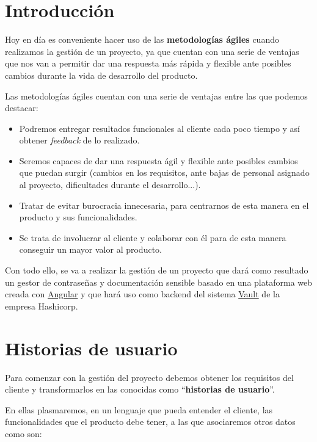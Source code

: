 \documentclass{\ClassPath/viu-tfm-template}
\begin{document}
    \graphicspath{{../VIU_TFM_LaTeX_template/}}

    \coverpage

    \tableofcontents

\chapter{Introducción}

Hoy en día es conveniente hacer uso de las \textbf{metodologías ágiles} cuando realizamos la gestión de un proyecto, ya que cuentan con una serie de ventajas que nos van a permitir dar una respuesta más rápida y flexible ante posibles cambios durante la vida de desarrollo del producto.

Las metodologías ágiles cuentan con una serie de ventajas entre las que podemos destacar:

\begin{itemize}
    \item Podremos entregar resultados funcionales al cliente cada poco tiempo y así obtener \textit{feedback} de lo realizado.
    \item Seremos capaces de dar una respuesta ágil y flexible ante posibles cambios que puedan surgir (cambios en los requisitos, ante bajas de personal asignado al proyecto, dificultades durante el desarrollo...).
    \item Tratar de evitar burocracia innecesaria, para centrarnos de esta manera en el producto y sus funcionalidades.
    \item Se trata de involucrar al cliente y colaborar con él para de esta manera conseguir un mayor valor al producto.
\end{itemize}

Con todo ello, se va a realizar la gestión de un proyecto que dará como resultado un gestor de contraseñas y documentación sensible basado en una plataforma web creada con \href{https://angular.io/}{Angular} y que hará uso como backend del sistema \href{https://www.vaultproject.io/}{Vault} de la empresa Hashicorp.


\chapter{Historias de usuario}

Para comenzar con la gestión del proyecto debemos obtener los requisitos del cliente y transformarlos en las conocidas como “\textbf{historias de usuario}”.

En ellas plasmaremos, en un lenguaje que pueda entender el cliente, las funcionalidades que el producto debe tener, a las que asociaremos otros datos como son:
\end{document}
